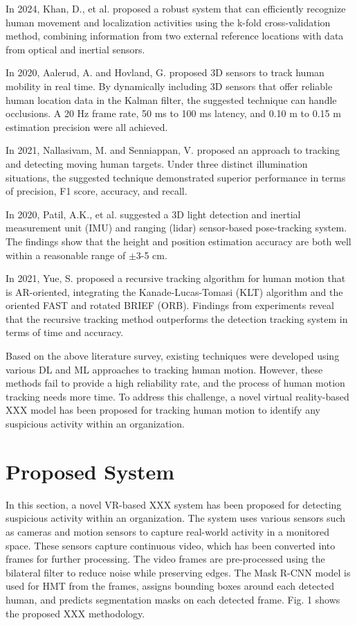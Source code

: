 \documentclass[conference]{IEEEtran}
\begin{document}
In 2024, Khan, D., et al. \cite{b17} proposed a robust system that can efficiently recognize human movement and localization activities using the k-fold cross-validation method, combining information from two external reference locations with data from optical and inertial sensors.

In 2020, Aalerud, A. and Hovland, G. \cite{b18} proposed 3D sensors to track human mobility in real time. By dynamically including 3D sensors that offer reliable human location data in the Kalman filter, the suggested technique can handle occlusions. A 20 Hz frame rate, 50 ms to 100 ms latency, and 0.10 m to 0.15 m estimation precision were all achieved.

In 2021, Nallasivam, M. and Senniappan, V. \cite{b19} proposed an approach to tracking and detecting moving human targets. Under three distinct illumination situations, the suggested technique demonstrated superior performance in terms of precision, F1 score, accuracy, and recall.

In 2020, Patil, A.K., et al. \cite{b20} suggested a 3D light detection and inertial measurement unit (IMU) and ranging (lidar) sensor-based pose-tracking system. The findings show that the height and position estimation accuracy are both well within a reasonable range of $\pm$3-5 cm.

In 2021, Yue, S. \cite{b21} proposed a recursive tracking algorithm for human motion that is AR-oriented, integrating the Kanade-Lucas-Tomasi (KLT) algorithm and the oriented FAST and rotated BRIEF (ORB). Findings from experiments reveal that the recursive tracking method outperforms the detection tracking system in terms of time and accuracy.

Based on the above literature survey, existing techniques were developed using various DL and ML approaches to tracking human motion. However, these methods fail to provide a high reliability rate, and the process of human motion tracking needs more time. To address this challenge, a novel virtual reality-based XXX model has been proposed for tracking human motion to identify any suspicious activity within an organization.

\section{Proposed System}

In this section, a novel VR-based XXX system has been proposed for detecting suspicious activity within an organization. The system uses various sensors such as cameras and motion sensors to capture real-world activity in a monitored space. These sensors capture continuous video, which has been converted into frames for further processing. The video frames are pre-processed using the bilateral filter to reduce noise while preserving edges. The Mask R-CNN model is used for HMT from the frames, assigns bounding boxes around each detected human, and predicts segmentation masks on each detected frame. Fig. 1 shows the proposed XXX methodology.
\end{document}
